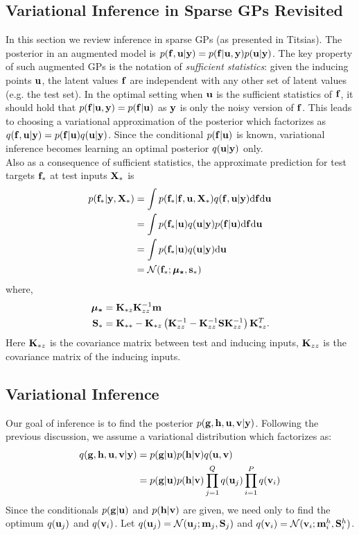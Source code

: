 \subsection{Variational Inference in Sparse GPs Revisited}
In this section we review inference in sparse GPs (as presented in Titsias).
The posterior in an augmented model is $p(\mathbf{f}, \mathbf{u} | \mathbf{y}) = p(\mathbf{f} | \mathbf{u}, \mathbf{y}) p(\mathbf{u} | \mathbf{y})$.
The key property of such augmented GPs  is the notation of \textit{sufficient statistics}: given the inducing points $\mathbf{u}$, the latent values $\mathbf{f}$ are independent with any other set of latent values (e.g. the test set).
In the optimal setting when $\mathbf{u}$ is the sufficient statistics of $\mathbf{f}$, it should hold that $p(\mathbf{f} | \mathbf{u}, \mathbf{y}) = p(\mathbf{f} | \mathbf{u})$ as $\mathbf{y}$ is only the noisy version of $\mathbf{f}$.
This leads to choosing a variational approximation of the posterior which factorizes as $q(\mathbf{f}, \mathbf{u} | \mathbf{y}) = p(\mathbf{f} | \mathbf{u}) q(\mathbf{u} | \mathbf{y})$.
Since the conditional $p(\mathbf{f} | \mathbf{u})$ is known, variational inference becomes learning an optimal posterior $q(\mathbf{u} | \mathbf{y})$ only. \\

\noindent Also as a consequence of sufficient statistics, the approximate prediction for test targets $\mathbf{f}_*$ at test inputs $\mathbf{X}_*$ is
\begin{align}
\nonumber
p(\mathbf{f}_* | \mathbf{y}, \mathbf{X}_*) &= \int p(\mathbf{f}_* | \mathbf{f}, \mathbf{u}, \mathbf{X}_*) q(\mathbf{f}, \mathbf{u} | \mathbf{y}) \mathrm{d} \mathbf{f} \mathrm{d} \mathbf{u} \\
\nonumber
&= \int p(\mathbf{f}_* | \mathbf{u}) q(\mathbf{u}| \mathbf{y}) p(\mathbf{f} | \mathbf{u}) \mathrm{d} \mathbf{f} \mathrm{d} \mathbf{u} \\ \nonumber
&= \int p(\mathbf{f}_* | \mathbf{u}) q(\mathbf{u}| \mathbf{y}) \mathrm{d} \mathbf{u} \\
\label{eq:sorprediction}
&= \mathcal{N}(\mathbf{f}_*; \boldsymbol{\mu_*},\mathbf{s_*})
\end{align}
where,
\begin{align}
\nonumber
\boldsymbol{\mu_*} &= \mathbf{K}_{*z} \mathbf{K}_{zz}^{-1}\mathbf{m} \\ 
\nonumber
\mathbf{S}_* &= \mathbf{K}_{**} - \mathbf{K}_{*z} \left(\mathbf{K}_{zz}^{-1} - \mathbf{K}_{zz}^{-1} \mathbf{S} \mathbf{K}_{zz}^{-1} \right) \mathbf{K}_{*z}^T.
\end{align}
 Here $\mathbf{K}_{*z}$ is the covariance matrix between test and inducing inputs, $\mathbf{K}_{zz}$ is the covariance matrix of the inducing inputs.

\subsection{Variational Inference}
\newcommand{\ug}{\u_g}
\newcommand{\uh}{\u^h}
\newcommand{\mgj}{\m_j}
\newcommand{\mhi}{\m^h_i}
\newcommand{\Sgj}{\S_j}
\newcommand{\Shi}{\S^h_i}
Our goal of inference is to find the posterior $p(\mathbf{g}, \mathbf{h}, \mathbf{u}, \mathbf{v} | \mathbf{y})$. 
Following the previous discussion, we assume a variational distribution which factorizes as:
\begin{align}
\nonumber
q(\mathbf{g}, \mathbf{h}, \mathbf{u}, \mathbf{v} | \mathbf{y})
\nonumber
 &= p(\mathbf{g}|\mathbf{u}) p(\mathbf{h}|\mathbf{v}) q(\mathbf{u},\mathbf{v})  \\
 &= p(\mathbf{g}|\mathbf{u}) p(\mathbf{h}|\mathbf{v}) \prod_{j=1}^Q q(\mathbf{u}_j) \prod_{i=1}^P  q(\mathbf{v}_i)
\end{align}
Since the conditionals $p(\mathbf{g} | \mathbf{u})$ and $p(\mathbf{h} | \mathbf{v})$ are given, we need only to find the optimum $q(\mathbf{u}_j)$ and $q(\mathbf{v}_i)$.
Let $q(\u_j) = \Normal(\u_j; \mgj, \Sgj)$ and $q(\v_i) = \Normal(\v_i; \mhi, \Shi)$. \\

